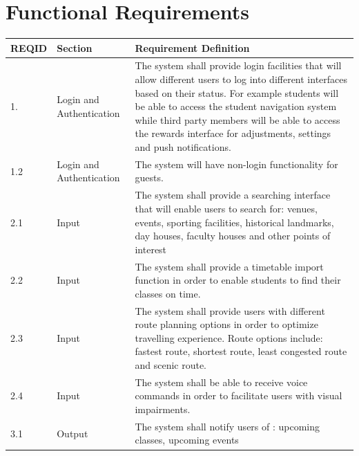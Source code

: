 \documentclass[11pt]{article}
\begin{document}
\section{Functional Requirements}
\begin{longtable}{|p{}| p{} | p{} |}

\hline

REQID& Section & Requirement Definition \\

\hline

1.& Login and Authentication & The system shall provide login facilities that will allow different users to log into different interfaces based on their status. For example students will be able to access the student navigation system while third party members will be able to access the rewards interface for adjustments, settings and push notifications.  \\

\hline

1.2& Login and Authentication   & The system will have non-login functionality for guests. \\

\hline

2.1& Input & The system shall provide a searching interface that will enable users to search for: venues, events, sporting facilities, historical landmarks, day houses, faculty houses and other points of interest  \\

\hline

2.2& Input  & The system shall provide a timetable import function in order to enable students to find their classes on time.  \\

\hline

2.3& Input  & The system shall provide users with different route planning options in order to optimize travelling experience. Route options include: fastest route, shortest route, least congested route and scenic route. \\

\hline

2.4& Input  & The system shall be able to receive voice commands in order to facilitate users with visual impairments.\\

\hline

3.1& Output & The system shall notify users of : upcoming classes, upcoming events\\


\end{longtable}
\end{document}
